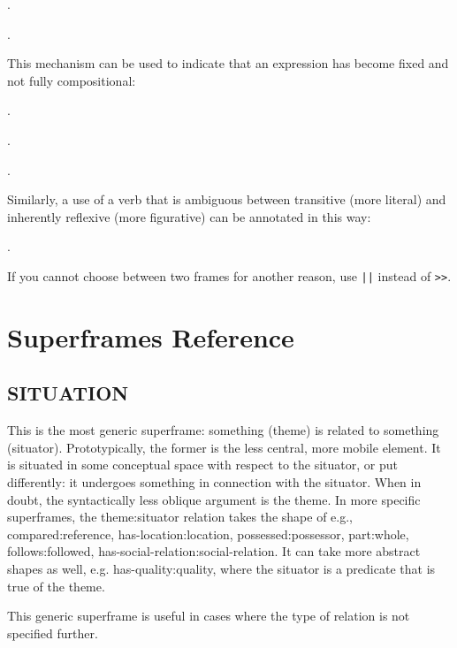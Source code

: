 \documentclass[a4paper]{article}
\newcommand{\fr}[1]{\textsf{#1}}
\newcommand{\rl}[1]{\textsf{#1}}
\begin{document}
\ex.

\ex.

This mechanism can be used to indicate that an expression has become fixed and
not fully compositional:

\ex.

\ex.

\ex.

Similarly, a use of a verb that is ambiguous between transitive (more literal)
and inherently reflexive (more figurative) can be annotated in this way:

\ex.

If you cannot choose between two frames for another reason, use \texttt{||} instead of \texttt{>}\texttt{>}.


\newpage\section{Superframes Reference}

\subsection{ \fr{SITUATION}}
\label{sec:SITUATION}

This is the most generic superframe: something (\rl{theme}) is related to
something (\rl{situator}). Prototypically, the former is the less central, more
mobile element. It is situated in some conceptual space with respect to the
situator, or put differently: it undergoes something in connection with the
situator. When in doubt, the syntactically less oblique argument is the
theme. In more specific superframes, the theme:situator relation takes
the shape of e.g., compared:reference, has-location:location,
possessed:possessor, part:whole, follows:followed,
has-social-relation:social-relation. It can take more abstract shapes as well,
e.g. has-quality:quality, where the situator is a predicate that is true of the
theme.

This generic superframe is useful in cases where the type of relation is not
specified further.
\end{document}
